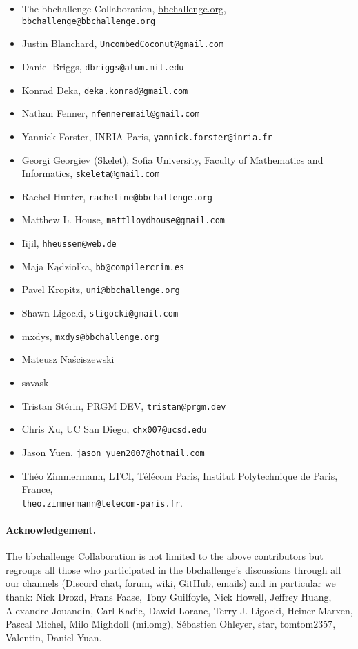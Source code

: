 \documentclass[a4paper,british]{article}
\theoremstyle{definition} %
\numberwithin{equation}{section}
\theoremstyle{definition} %
\begin{document}
\begin{itemize}
    \item The bbchallenge Collaboration, \url{bbchallenge.org}, \texttt{bbchallenge@bbchallenge.org}
    \item Justin Blanchard, \texttt{UncombedCoconut@gmail.com}
    \item Daniel Briggs, \texttt{dbriggs@alum.mit.edu}
    \item Konrad Deka, \texttt{deka.konrad@gmail.com}
    \item Nathan Fenner, \texttt{nfenneremail@gmail.com}
    \item Yannick Forster, INRIA Paris, \texttt{yannick.forster@inria.fr}
    \item Georgi Georgiev (Skelet), Sofia University, Faculty of Mathematics and Informatics, \texttt{skeleta@gmail.com}
    \item Rachel Hunter, \texttt{racheline@bbchallenge.org}
    \item Matthew L. House, \texttt{mattlloydhouse@gmail.com}
    \item Iijil, \texttt{hheussen@web.de}
    \item Maja Kądziołka, \texttt{bb@compilercrim.es}
    \item Pavel Kropitz, \texttt{uni@bbchallenge.org}
    \item Shawn Ligocki, \texttt{sligocki@gmail.com}
    \item mxdys, \texttt{mxdys@bbchallenge.org}
    \item Mateusz Na\'{s}ciszewski
    \item savask
    \item Tristan Stérin, PRGM DEV, \texttt{tristan@prgm.dev}
    \item Chris Xu, UC San Diego, \texttt{chx007@ucsd.edu}
    \item Jason Yuen, \texttt{jason\_yuen2007@hotmail.com}
    \item Théo Zimmermann, LTCI, Télécom Paris, Institut Polytechnique de Paris, France, \\ \texttt{theo.zimmermann@telecom-paris.fr}.
\end{itemize}

\paragraph{Acknowledgement.} The bbchallenge Collaboration is not limited to the above contributors but regroups all those who participated in the bbchallenge's discussions through all our channels (Discord chat, forum, wiki, GitHub, emails) and in particular we thank:  Nick Drozd, Frans Faase, Tony Guilfoyle, Nick Howell, Jeffrey Huang, Alexandre Jouandin, Carl Kadie, Dawid Loranc, Terry J. Ligocki, Heiner Marxen, Pascal Michel, Milo Mighdoll (milomg), Sébastien Ohleyer, star, tomtom2357, Valentin, Daniel Yuan.
\end{document}
